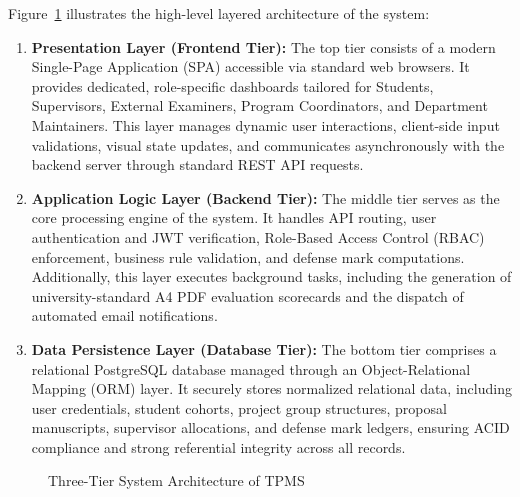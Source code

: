 Figure~\ref{fig:arch} illustrates the high-level layered architecture of the system:

\begin{enumerate}
  \item \textbf{Presentation Layer (Frontend Tier):}  
  The top tier consists of a modern Single-Page Application (SPA) accessible via standard web browsers. It provides dedicated, role-specific dashboards tailored for Students, Supervisors, External Examiners, Program Coordinators, and Department Maintainers. This layer manages dynamic user interactions, client-side input validations, visual state updates, and communicates asynchronously with the backend server through standard REST API requests.

  \item \textbf{Application Logic Layer (Backend Tier):}  
  The middle tier serves as the core processing engine of the system. It handles API routing, user authentication and JWT verification, Role-Based Access Control (RBAC) enforcement, business rule validation, and defense mark computations. Additionally, this layer executes background tasks, including the generation of university-standard A4 PDF evaluation scorecards and the dispatch of automated email notifications.

  \item \textbf{Data Persistence Layer (Database Tier):}  
  The bottom tier comprises a relational PostgreSQL database managed through an Object-Relational Mapping (ORM) layer. It securely stores normalized relational data, including user credentials, student cohorts, project group structures, proposal manuscripts, supervisor allocations, and defense mark ledgers, ensuring ACID compliance and strong referential integrity across all records.
\end{enumerate}

\begin{figure}[H]
\centering
{}
\caption{Three-Tier System Architecture of TPMS}
\label{fig:arch}
\end{figure}


